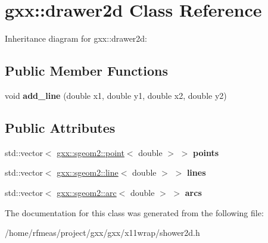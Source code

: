\hypertarget{classgxx_1_1drawer2d}{}\section{gxx\+:\+:drawer2d Class Reference}
\label{classgxx_1_1drawer2d}


Inheritance diagram for gxx\+:\+:drawer2d\+:
\subsection*{Public Member Functions}
\begin{DoxyCompactItemize}
\item 
void {\bfseries add\+\_\+line} (double x1, double y1, double x2, double y2)\hypertarget{classgxx_1_1drawer2d_adcba98404f8d35e9e7a244c9e91756dc}{}\label{classgxx_1_1drawer2d_adcba98404f8d35e9e7a244c9e91756dc}

\end{DoxyCompactItemize}
\subsection*{Public Attributes}
\begin{DoxyCompactItemize}
\item 
std\+::vector$<$ \hyperlink{structgxx_1_1sgeom2_1_1point}{gxx\+::sgeom2\+::point}$<$ double $>$ $>$ {\bfseries points}\hypertarget{classgxx_1_1drawer2d_a2dd77a513bf244a5d81da391805f6471}{}\label{classgxx_1_1drawer2d_a2dd77a513bf244a5d81da391805f6471}

\item 
std\+::vector$<$ \hyperlink{structgxx_1_1sgeom2_1_1line}{gxx\+::sgeom2\+::line}$<$ double $>$ $>$ {\bfseries lines}\hypertarget{classgxx_1_1drawer2d_ac1b71acc53a28824b059515974566793}{}\label{classgxx_1_1drawer2d_ac1b71acc53a28824b059515974566793}

\item 
std\+::vector$<$ \hyperlink{structgxx_1_1sgeom2_1_1arc}{gxx\+::sgeom2\+::arc}$<$ double $>$ $>$ {\bfseries arcs}\hypertarget{classgxx_1_1drawer2d_aabda642d3a3b4c52db41a728b7171e41}{}\label{classgxx_1_1drawer2d_aabda642d3a3b4c52db41a728b7171e41}

\end{DoxyCompactItemize}


The documentation for this class was generated from the following file\+:\begin{DoxyCompactItemize}
\item 
/home/rfmeas/project/gxx/gxx/x11wrap/shower2d.\+h\end{DoxyCompactItemize}

